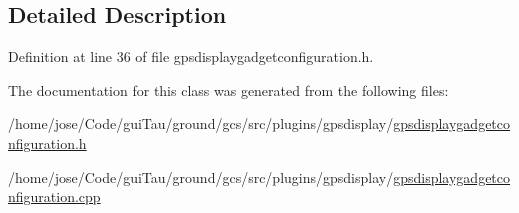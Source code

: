 \subsection{Detailed Description}


Definition at line 36 of file gpsdisplaygadgetconfiguration.\-h.



The documentation for this class was generated from the following files\-:\begin{DoxyCompactItemize}
\item 
/home/jose/\-Code/gui\-Tau/ground/gcs/src/plugins/gpsdisplay/\hyperlink{gpsdisplaygadgetconfiguration_8h}{gpsdisplaygadgetconfiguration.\-h}\item 
/home/jose/\-Code/gui\-Tau/ground/gcs/src/plugins/gpsdisplay/\hyperlink{gpsdisplaygadgetconfiguration_8cpp}{gpsdisplaygadgetconfiguration.\-cpp}\end{DoxyCompactItemize}
